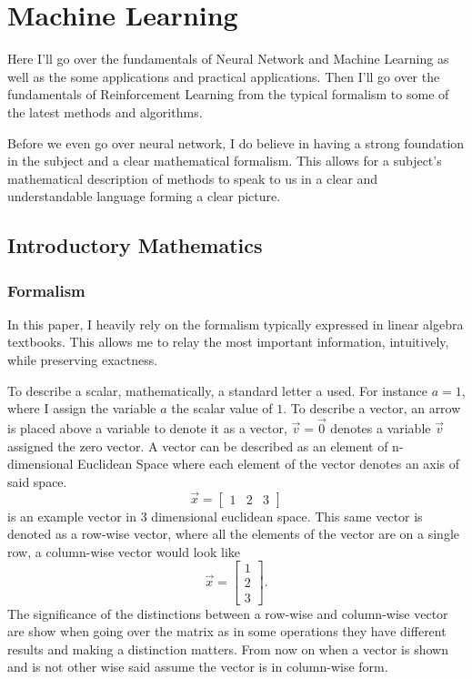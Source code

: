 \chapter{Machine Learning}\label{ch:ML}

Here I'll go over the fundamentals of Neural Network and Machine Learning as well as the some applications and practical applications. Then I'll go over the fundamentals of Reinforcement Learning from the typical formalism to some of the latest methods and algorithms.

Before we even go over neural network, I do believe in having a strong foundation in the subject and a clear mathematical formalism. This allows for a subject's mathematical description of methods to speak to us in a clear and understandable language forming a clear picture.

\section{Introductory Mathematics}

\subsection{Formalism}

In this paper, I heavily rely on the formalism typically expressed in linear algebra textbooks. This allows me to relay the most important information, intuitively, while preserving exactness.

To describe a scalar, mathematically, a standard letter a used. For instance $a=1$, where I assign the variable $a$ the scalar value of $1$. To describe a vector, an arrow is placed above a variable to denote it as a vector, $\vec{v}=\vec{0}$ denotes a variable $\vec{v}$ assigned the zero vector. A vector can be described as an element of n-dimensional Euclidean Space where each element of the vector denotes an axis of said space. $$\vec{x}=\begin{bmatrix}1 & 2 & 3\end{bmatrix}$$ is an example vector in 3 dimensional euclidean space. This same vector is denoted as a row-wise vector, where all the elements of the vector are on a single row, a column-wise vector would look like $$\vec{x}=\begin{bmatrix}1 \\ 2 \\ 3\end{bmatrix}.$$ The significance of the distinctions between a row-wise and column-wise vector are show when going over the matrix as in some operations they have different results and making a distinction matters. From now on when a vector is shown and is not other wise said assume the vector is in column-wise form. 

